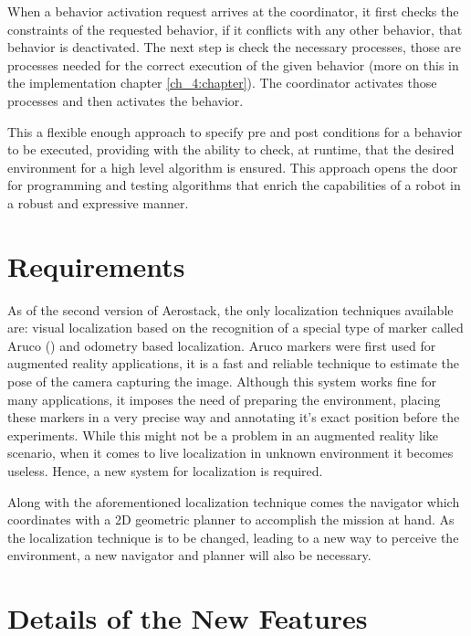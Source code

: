     When a behavior activation request arrives at the coordinator, it first checks the constraints of the requested behavior, if it conflicts with any other behavior, that behavior is deactivated. The next step is check the necessary processes, those are processes needed for the correct execution of the given behavior (more on this in the implementation chapter \ref{ch_4:chapter}). The coordinator activates those processes and then activates the behavior.

    This a flexible enough approach to specify pre and post conditions for a behavior to be executed, providing with the ability to check, at runtime, that the desired environment for a high level algorithm is ensured. This approach opens the door for programming and testing algorithms that enrich the capabilities of a robot in a robust and expressive manner.

  \section{Requirements} \label{ch_2:sect:requirements}

    As of the second version of Aerostack, the only localization techniques available are: visual localization based on the recognition of a special type of marker called Aruco (\cite{romeroramirez201838}) and odometry based localization. Aruco markers were first used for augmented reality applications, it is a fast and reliable technique to estimate the pose of the camera capturing the image. Although this system works fine for many applications, it imposes the need of preparing the environment, placing these markers in a very precise way and annotating it's exact position before the experiments. While this might not be a problem in an augmented reality like scenario, when it comes to live localization in unknown environment it becomes useless. Hence, a new system for localization is required.

    Along with the aforementioned localization technique comes the navigator which coordinates with a 2D geometric planner to accomplish the mission at hand. As the localization technique is to be changed, leading to a new way to perceive the environment, a new navigator and planner will also be necessary. 

  \section{Details of the New Features} \label{ch_2:sect:improvements}

